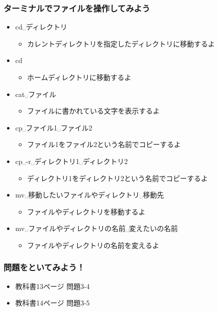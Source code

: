 \begin{frame}
    \frametitle{ターミナルでファイルを操作してみよう}
    \begin{itemize}
        \item cd␣ディレクトリ
        \begin{itemize}
            \item カレントディレクトリを指定したディレクトリに移動するよ
        \end{itemize}
        \item cd
        \begin{itemize}
            \item ホームディレクトリに移動するよ
        \end{itemize}
        \item cat␣ファイル
        \begin{itemize}
            \item ファイルに書かれている文字を表示するよ
        \end{itemize}
        \item cp␣ファイル1␣ファイル2
        \begin{itemize}
            \item ファイル1をファイル2という名前でコピーするよ
        \end{itemize}
        \item cp␣-r␣ディレクトリ1␣ディレクトリ2
        \begin{itemize}
            \item ディレクトリ1をディレクトリ2という名前でコピーするよ
        \end{itemize}
        \item mv␣移動したいファイルやディレクトリ␣移動先
        \begin{itemize}
            \item ファイルやディレクトリを移動するよ
        \end{itemize}
        \item mv␣ファイルやディレクトリの名前␣変えたいの名前
        \begin{itemize}
            \item ファイルやディレクトリの名前を変えるよ
        \end{itemize}
    \end{itemize}
\end{frame}

\begin{frame}
    \frametitle{問題をといてみよう！}
    \begin{itemize}
        \item 教科書13ページ 問題3-4
        \item 教科書14ページ 問題3-5
    \end{itemize}
\end{frame}

